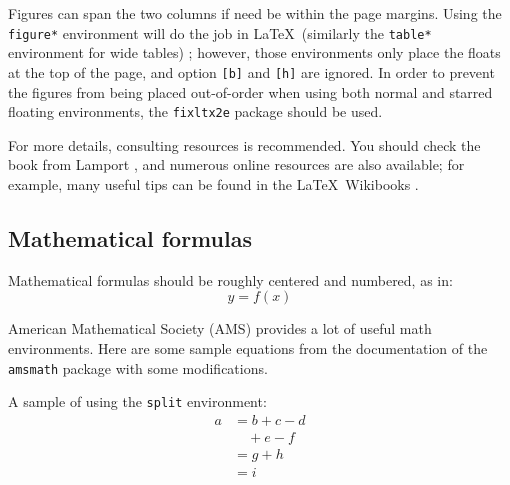 \documentclass[conference]{csce}
\begin{document}

Figures can span the two columns if need be within the page margins.
Using the \texttt{figure*} environment will do the job in \LaTeX\ (similarly the \texttt{table*} environment for wide tables) ; however, those environments only place the floats at the top of the page, and option \texttt{[b]} and \texttt{[h]} are ignored.
In order to prevent the figures from being placed out-of-order when using both normal and starred floating environments, 
the \texttt{fixltx2e} package should be used.


For more details, consulting resources is recommended.  You should check the book from Lamport \cite{Lamport}, and numerous online resources are also available; for example, many useful tips can be found in the \LaTeX\ Wikibooks \cite{LaTeXWikibook}.

\subsection{Mathematical formulas}\label{sec:math}
Mathematical formulas should be roughly centered and numbered, as in: 
\begin{equation}
  y = f(x)
\end{equation}

American Mathematical Society (AMS) provides a lot of useful math environments. Here are some sample equations from  the documentation of the \texttt{amsmath} package \cite{amsmathdoc} with some modifications.

A sample of using the \texttt{split} environment:
\begin{equation}\label{eqn:split}
\begin{split}
a& =b+c-d\\
 & \quad +e-f\\
 & =g+h\\
 & =i
\end{split}
\end{equation}
\end{document}

